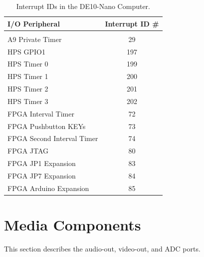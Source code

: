 \documentclass[11pt, twoside, pdftex]{article}
\newcommand{\commonFiles}{../../../common/doc}
\newcommand{\systemName}{DE10-Nano Computer}
\begin{document}
\begin{table}[h]
    \begin{center}
    \begin{tabular}{l|c}
            \textbf{I/O Peripheral} &
            \textbf{Interrupt ID \#}
				\\\hline\vspace{-3mm}\\
            A9 Private Timer & 29
        \\
            HPS GPIO1 & 197
        \\
            HPS Timer 0 & 199
        \\
            HPS Timer 1 & 200
        \\
            HPS Timer 2 & 201
        \\
            HPS Timer 3 & 202
        \\
		  FPGA Interval Timer & 72
        \\
		  FPGA Pushbutton KEYs & 73
        \\
		  FPGA Second Interval Timer & 74
        \\
		  FPGA JTAG & 80
        \\
		  FPGA JP1 Expansion & 83
        \\
		  FPGA JP7 Expansion & 84
        \\
		  FPGA Arduino Expansion & 85
        \\
    \end{tabular}
    \caption{Interrupt IDs in the \systemName.}
	 \label{tab:irq}
    \end{center}
\end{table}












\section{Media Components}
\label{sec:multi}

This section describes the audio-out, video-out, and ADC ports.
\end{document}
